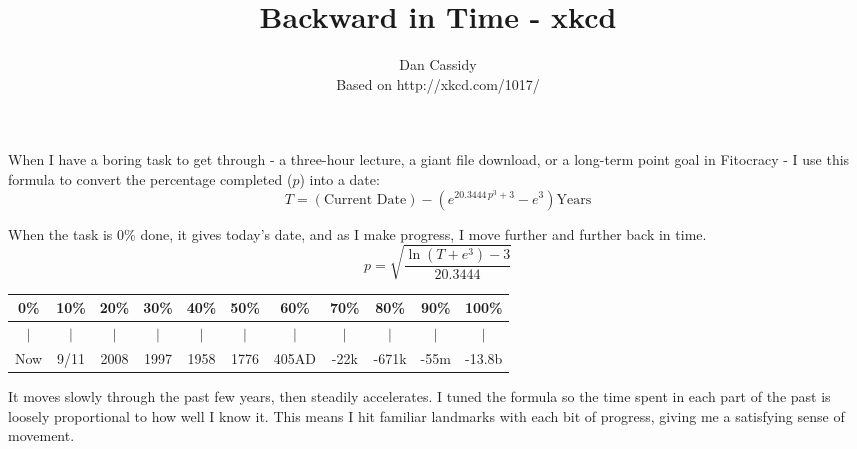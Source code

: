 \documentclass{article}
\title{Backward in Time - xkcd}
\author{Dan Cassidy\\Based on http://xkcd.com/1017/}
\begin{document}
\maketitle
When I have a boring task to get through - a three-hour lecture, a giant file download, or a long-term point goal in Fitocracy - I use this formula to convert the percentage completed ($p$) into a date:
$$ T=(\mbox{Current Date}) - \left(e^{20.3444\,p^3+3}-e^3\right)\mbox{Years} $$

When the task is $0\%$ done, it gives today's date, and as I make progress, I move further and further back in time.
$$ p=\sqrt{\frac{\ln(T+e^3)-3}{20.3444}} $$

\begin{table}[!htb]
\begin{tabular}{ccccccccccc}
0\% & 10\% & 20\% & 30\% & 40\% & 50\% & 60\% & 70\% & 80\% & 90\% & 100\% \\
\hline
$|$ & $|$ & $|$ & $|$ & $|$ & $|$ & $|$ & $|$ & $|$ & $|$ & $|$ \\
\hline
Now & 9/11 & 2008 & 1997 & 1958 & 1776 & 405AD & -22k & -671k & -55m & -13.8b \\
\end{tabular}
\end{table}

It moves slowly through the past few years, then steadily accelerates.  I tuned the formula so the time spent in each part of the past is loosely proportional to how well I know it.  This means I hit familiar landmarks with each bit of progress, giving me a satisfying sense of movement.
\end{document}
